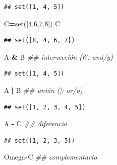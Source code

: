 \documentclass[]{book}
\newenvironment{Shaded}{\begin{snugshade}}{\end{snugshade}}
\newcommand{\BuiltInTok}[1]{#1}
\newcommand{\CommentTok}[1]{\textcolor[rgb]{0.56,0.35,0.01}{\textit{#1}}}
\newcommand{\DecValTok}[1]{\textcolor[rgb]{0.00,0.00,0.81}{#1}}
\newcommand{\NormalTok}[1]{#1}
\newcommand{\OperatorTok}[1]{\textcolor[rgb]{0.81,0.36,0.00}{\textbf{#1}}}
\begin{document}
\begin{verbatim}
## set([1, 4, 5])
\end{verbatim}

\begin{Shaded}
\begin{Highlighting}[]
\NormalTok{C}\OperatorTok{=}\BuiltInTok{set}\NormalTok{([}\DecValTok{4}\NormalTok{,}\DecValTok{6}\NormalTok{,}\DecValTok{7}\NormalTok{,}\DecValTok{8}\NormalTok{])}
\NormalTok{C}
\end{Highlighting}
\end{Shaded}

\begin{verbatim}
## set([8, 4, 6, 7])
\end{verbatim}

\begin{Shaded}
\begin{Highlighting}[]
\NormalTok{A }\OperatorTok{&}\NormalTok{ B   }\CommentTok{## intersección (&: and/y)}
\end{Highlighting}
\end{Shaded}

\begin{verbatim}
## set([1, 4, 5])
\end{verbatim}

\begin{Shaded}
\begin{Highlighting}[]
\NormalTok{A }\OperatorTok{|}\NormalTok{ B   }\CommentTok{## unión (|: or/o)}
\end{Highlighting}
\end{Shaded}

\begin{verbatim}
## set([1, 2, 3, 4, 5])
\end{verbatim}

\begin{Shaded}
\begin{Highlighting}[]
\NormalTok{A }\OperatorTok{-}\NormalTok{ C   }\CommentTok{## diferencia }
\end{Highlighting}
\end{Shaded}

\begin{verbatim}
## set([1, 2, 3, 5])
\end{verbatim}

\begin{Shaded}
\begin{Highlighting}[]
\NormalTok{Omega}\OperatorTok{-}\NormalTok{C }\CommentTok{## complementario.}
\end{Highlighting}
\end{Shaded}
\end{document}
